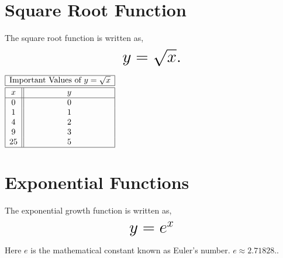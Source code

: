 \documentclass[nooutcomes]{ximera}
\begin{document}
\newpage


\section{Square Root Function}
The square root function is written as, $$ \mbox{\huge $y=\sqrt{x}.$}$$ 

\begin{image}
\end{image}


\begin{center}
$
\begin{array}{ |c || c|  }
 \hline
 \multicolumn{2}{|c|}{\text{\normalfont Important Values of } y=\sqrt{x}} \\
\hline
 \hline
 x & y\\
 \hline
 0&0\\
 1&1\\
 4&2\\
 9&3\\
 25&5\\
 \hline
\end{array}
$
\end{center}



\newpage


\section{Exponential Functions}
The exponential growth function is written as, $$ \mbox{\huge $y=e^{x}$}$$ 

Here $e$ is the mathematical constant known as Euler's number.  $e \approx 2.71828 .$.

\begin{image}
\end{image}
\end{document}
